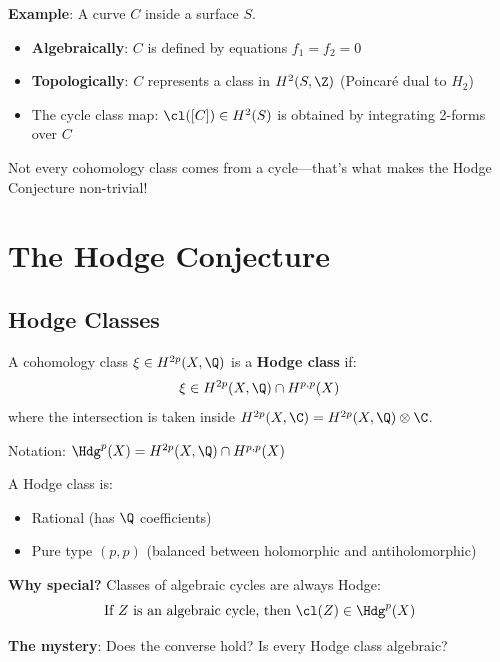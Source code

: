 \begin{intuitive}
\textbf{Example}: A curve $C$ inside a surface $S$.

\begin{itemize}
\item \textbf{Algebraically}: $C$ is defined by equations $f_1 = f_2 = 0$
\item \textbf{Topologically}: $C$ represents a class in $H^2(S, \Z)$ (Poincaré dual to $H_2$)
\item The cycle class map: $\cl([C]) \in H^2(S)$ is obtained by integrating 2-forms over $C$
\end{itemize}

Not every cohomology class comes from a cycle—that's what makes the Hodge Conjecture non-trivial!
\end{intuitive}

\section{The Hodge Conjecture}

\subsection{Hodge Classes}

\begin{defn}\label{def:hodge-class}
A cohomology class $\xi \in H^{2p}(X, \Q)$ is a \textbf{Hodge class} if:
\begin{equation}
\xi \in H^{2p}(X, \Q) \cap H^{p,p}(X)
\end{equation}
where the intersection is taken inside $H^{2p}(X, \C) = H^{2p}(X, \Q) \otimes \C$.

Notation: $\Hdg^p(X) = H^{2p}(X, \Q) \cap H^{p,p}(X)$
\end{defn}

\begin{keyidea}
A Hodge class is:
\begin{itemize}
\item Rational (has $\Q$ coefficients)
\item Pure type $(p,p)$ (balanced between holomorphic and antiholomorphic)
\end{itemize}

\textbf{Why special?} Classes of algebraic cycles are always Hodge:
\begin{equation}
\text{If } Z \text{ is an algebraic cycle, then } \cl(Z) \in \Hdg^p(X)
\end{equation}

\textbf{The mystery}: Does the converse hold? Is every Hodge class algebraic?
\end{keyidea}

